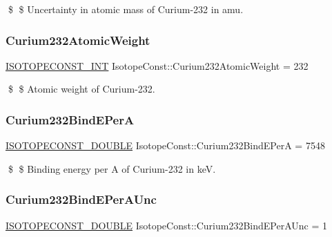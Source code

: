 \$ \$ Uncertainty in atomic mass of Curium-\/232 in amu. \mbox{\label{group___isotope_const-_curium-_cm232_gad80d46ba5da46e20267a2871eb53a70d}} 
\subsubsection{\texorpdfstring{Curium232\+Atomic\+Weight}{Curium232AtomicWeight}}
{\footnotesize\ttfamily \mbox{\hyperlink{group___isotope_const-_macros_ga5f18360b3e99483a35c32d789e62621c}{I\+S\+O\+T\+O\+P\+E\+C\+O\+N\+S\+T\+\_\+\+I\+NT}} Isotope\+Const\+::\+Curium232\+Atomic\+Weight = 232}

\$ \$ Atomic weight of Curium-\/232. \mbox{\label{group___isotope_const-_curium-_cm232_gab1b8206d21b803e69ac57dd0b68a6e4e}} 
\subsubsection{\texorpdfstring{Curium232\+Bind\+E\+PerA}{Curium232BindEPerA}}
{\footnotesize\ttfamily \mbox{\hyperlink{group___isotope_const-_macros_ga8f45a7272ce02c0b4c65c44636ed719a}{I\+S\+O\+T\+O\+P\+E\+C\+O\+N\+S\+T\+\_\+\+D\+O\+U\+B\+LE}} Isotope\+Const\+::\+Curium232\+Bind\+E\+PerA = 7548}

\$ \$ Binding energy per A of Curium-\/232 in keV. \mbox{\label{group___isotope_const-_curium-_cm232_gafc771b471f9f57715c42cb1585d62d46}} 
\subsubsection{\texorpdfstring{Curium232\+Bind\+E\+Per\+A\+Unc}{Curium232BindEPerAUnc}}
{\footnotesize\ttfamily \mbox{\hyperlink{group___isotope_const-_macros_ga8f45a7272ce02c0b4c65c44636ed719a}{I\+S\+O\+T\+O\+P\+E\+C\+O\+N\+S\+T\+\_\+\+D\+O\+U\+B\+LE}} Isotope\+Const\+::\+Curium232\+Bind\+E\+Per\+A\+Unc = 1}

